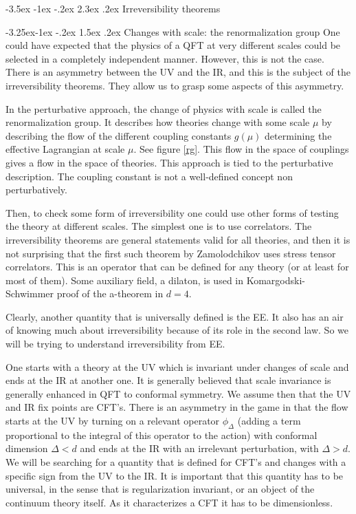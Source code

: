 \documentclass[11pt,a4paper]{article}
\makeatletter
\renewcommand\section{\@startsection {section}{1}{\z@}%
                                 {-3.5ex \@plus -1ex \@minus -.2ex}%
                                   {2.3ex \@plus.2ex}%
                                   {\normalfont\large\bfseries}}
\renewcommand\subsection{\@startsection{subsection}{2}{\z@}%
                                   {-3.25ex\@plus -1ex \@minus -.2ex}%
                                     {1.5ex \@plus .2ex}%
                                     {\normalfont\bfseries}}
\numberwithin{equation}{section}
\makeatother
\begin{document}
\newpage
 
\section{Irreversibility theorems}

\subsection{Changes with scale: the renormalization group}
One could have expected that the physics of a QFT at very different scales could be selected in a completely independent manner. However, this is not the case. There is an asymmetry between the UV and the IR, and this is the subject of the irreversibility theorems. They allow us to grasp some aspects of this asymmetry. 

In the perturbative approach, the change of physics with scale is called the renormalization group. It describes how theories change with some scale $\mu$ by describing the flow of the different coupling constants $g(\mu)$ determining the effective Lagrangian at scale $\mu$. See figure \ref{rg}. This flow in the space of couplings gives a flow in the space of theories. 
 This approach is tied to the perturbative description. The coupling constant is not a well-defined concept non perturbatively. 

Then, to check some form of irreversibility one could use other forms of testing the theory at different scales. The simplest one is to use correlators. The irreversibility theorems are general statements valid for all theories, and then it is not surprising that the first such theorem by Zamolodchikov uses stress tensor correlators.  This is an operator that can be defined for any theory (or at least for most of them). Some auxiliary field, a dilaton, is used in Komargodski-Schwimmer proof of the a-theorem in $d=4$.

Clearly, another quantity that is universally defined is the EE. It also has an air of knowing much about irreversibility because of its role in the second law. So we will be trying to understand irreversibility from EE.
  
One starts with a theory at the UV which is invariant under changes of scale and ends at the IR at another one. It is generally believed that scale invariance is generally enhanced in QFT to conformal symmetry. We assume then that the UV and IR fix points are CFT's. There is an asymmetry in the game in that the flow starts at the UV by turning on a relevant operator $\phi_\Delta$ (adding a term proportional to the integral of this operator to the action) with conformal dimension $\Delta< d$ and ends at the IR with an irrelevant perturbation, with $\Delta>d$. 
We will be searching for a quantity that is defined for CFT's and changes with a specific sign from the UV to the IR. It is important that this quantity has to be universal, in the sense that is regularization invariant, or an object of the continuum theory itself. As it characterizes a CFT it has to be dimensionless.   
\end{document}
